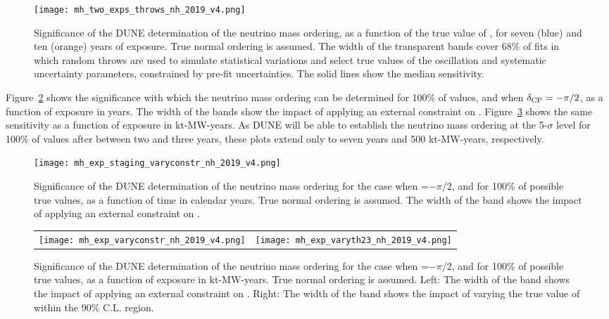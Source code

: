 \begin{figure}[h!]
    \centering
		\texttt{[image: mh\_two\_exps\_throws\_nh\_2019\_v4.png]}
	\caption[Significance of the DUNE neutrino mass ordering determination, as a function of \deltacp]{Significance of the DUNE determination of the neutrino mass ordering, as a function of the true value of \deltacp, for seven (blue) and ten (orange) years of exposure. True normal ordering is assumed. The width of the transparent bands cover 68\% of fits in which random throws are used to simulate statistical variations and select true values of the oscillation and systematic uncertainty parameters, constrained by pre-fit uncertainties. The solid lines show the median sensitivity. }
    \label{fig:mh_nominal}
\end{figure}

Figure~\ref{fig:mh_staging} shows the significance
with which the neutrino mass ordering can be determined for 100\% of \deltacp values, and when $\delta_{\rm CP}=-\pi/2$, as a function of exposure in years. The width of the bands show the impact of applying an external constraint on . Figure~\ref{fig:mh_exposure} shows the same sensitivity as a function of exposure in kt-MW-years. As DUNE will be able to establish the neutrino mass ordering at the 5-$\sigma$ level for 100\% of \deltacp values after between two and three years, these plots extend only to seven years and 500 kt-MW-years, respectively.

\begin{figure}[h!]
    \centering
	\texttt{[image: mh\_exp\_staging\_varyconstr\_nh\_2019\_v4.png]}	
	\caption[Significance of the DUNE neutrino mass ordering determination, as a function of time]{Significance of the DUNE determination of the neutrino mass ordering for the case when \deltacp=$-\pi/2$, and for 100\% of possible true \deltacp values, as a function of time in calendar years. True normal ordering is assumed. The width of the band shows the impact of applying an external constraint on .}
    \label{fig:mh_staging}
\end{figure}

\begin{figure}[h!]
    \centering
    \begin{tabular}{cc}
    \texttt{[image: mh\_exp\_varyconstr\_nh\_2019\_v4.png]} &
	\texttt{[image: mh\_exp\_varyth23\_nh\_2019\_v4.png]} 
	\end{tabular}
	\caption[Significance of the DUNE neutrino mass ordering determination as a function of exposure]{Significance of the DUNE determination of the neutrino mass ordering for the case when \deltacp=$-\pi/2$, and for 100\% of possible true \deltacp values, as a function of exposure in kt-MW-years. True normal ordering is assumed. Left: The width of the band shows the impact of applying an external constraint on . Right: The width of the band shows the impact of varying the true value of  within the  90\% C.L. region.}
    \label{fig:mh_exposure}
\end{figure}


